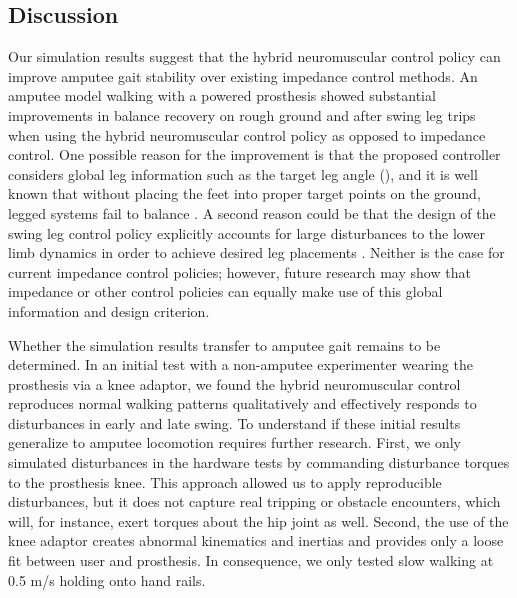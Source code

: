 \subsection{Discussion}\label{sec:completed_comparison_discuss}

Our simulation results suggest that the hybrid neuromuscular control policy can
improve amputee gait stability over existing impedance control methods. An
amputee model walking with a powered prosthesis showed substantial improvements
in balance recovery on rough ground and after swing leg trips when using the
hybrid neuromuscular control policy as opposed to impedance control.  One
possible reason for the improvement is that the proposed controller considers
global leg information such as the target leg angle
(), and it is well known that without placing
the feet into proper target points on the ground, legged systems fail to balance
\citep{townsend1985biped,raibert1986legged,kajita20013d,
seyfarth2002movement,pratt2006capture,wu20133}. A second reason could be that
the design of the swing leg control policy explicitly accounts for large
disturbances to the lower limb dynamics in order to achieve desired leg
placements \citep{desai2012robust}. Neither is the case for current impedance
control policies; however, future research may show that impedance or other
control policies can equally make use of this global information and design
criterion.

Whether the simulation results transfer to amputee gait remains to be
determined. In an initial test with a non-amputee experimenter wearing the
prosthesis via a knee adaptor, we found the hybrid neuromuscular control
reproduces normal walking patterns qualitatively and effectively responds to
disturbances in early and late swing. To understand if these initial results
generalize to amputee locomotion requires further research. First, we only
simulated disturbances in the hardware tests by commanding disturbance torques
to the prosthesis knee. This approach allowed us to apply reproducible
disturbances, but it does not capture real tripping or obstacle encounters,
which will, for instance, exert torques about the hip joint as well.  Second,
the use of the knee adaptor creates abnormal kinematics and inertias and
provides only a loose fit between user and prosthesis. In consequence, we only
tested slow walking at 0.5 m/s holding onto hand rails.

